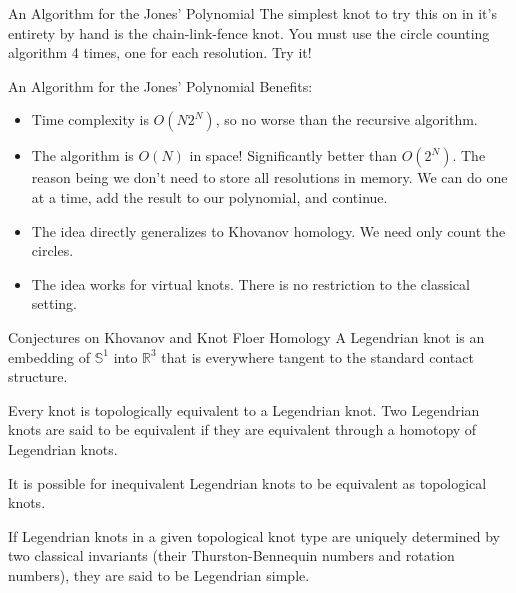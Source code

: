 \documentclass{beamer}
\begin{document}
    \begin{frame}{An Algorithm for the Jones' Polynomial}
        The simplest knot to try this on in it's entirety by hand is the
        chain-link-fence knot. You must use the circle counting algorithm
        4 times, one for each resolution. Try it!
    \end{frame}
    \begin{frame}{An Algorithm for the Jones' Polynomial}
        Benefits:
        \begin{itemize}
            \item Time complexity is $O(N2^{N})$, so no worse than the
                  recursive algorithm.
            \item The algorithm is $O(N)$ in space! Significantly better than
                  $O(2^{N})$. The reason being we don't need to store all
                  resolutions in memory. We can do one at a time, add the
                  result to our polynomial, and continue.
            \item The idea directly generalizes to Khovanov homology. We need
                  only count the circles.
            \item The idea works for virtual knots. There is no restriction to
                  the classical setting.
        \end{itemize}
    \end{frame}
    \begin{frame}{Conjectures on Khovanov and Knot Floer Homology}
        A Legendrian knot is an embedding of $\mathbb{S}^{1}$ into
        $\mathbb{R}^{3}$ that is everywhere tangent to the standard
        contact structure.
        \par\hfill\par
        Every knot is topologically equivalent to a Legendrian knot. Two
        Legendrian knots are said to be equivalent if they are equivalent
        through a homotopy of Legendrian knots.
        \par\hfill\par
        It is possible for inequivalent
        Legendrian knots to be equivalent as topological knots.
        \par\hfill\par
        If Legendrian knots in a given topological knot type are uniquely
        determined by two classical invariants (their Thurston-Bennequin
        numbers and rotation numbers), they are said to be Legendrian simple.
    \end{frame}
\end{document}
